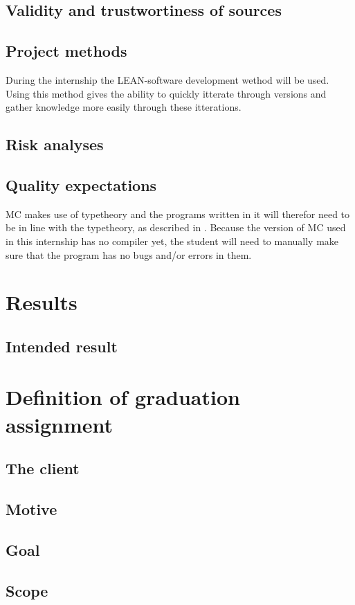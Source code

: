 \section{Validity and trustwortiness of sources}

\section{Project methods}
During the internship the LEAN-software development wethod will be used\cite{ries2011lean}.
Using this method gives the ability to quickly itterate through versions and gather knowledge more easily through these itterations.

\section{Risk analyses}
\section{Quality expectations}
MC makes use of typetheory and the programs written in it will therefor need to be in line with the typetheory, as described in \cite{pierce2002types}.
Because the version of MC used in this internship has no compiler yet, the student will need to manually make sure that the program has no bugs and/or errors in them.

\chapter{Results}
\section{Intended result}

\chapter{Definition of graduation assignment}
\section{The client}
\section{Motive}
\section{Goal}
\section{Scope}
